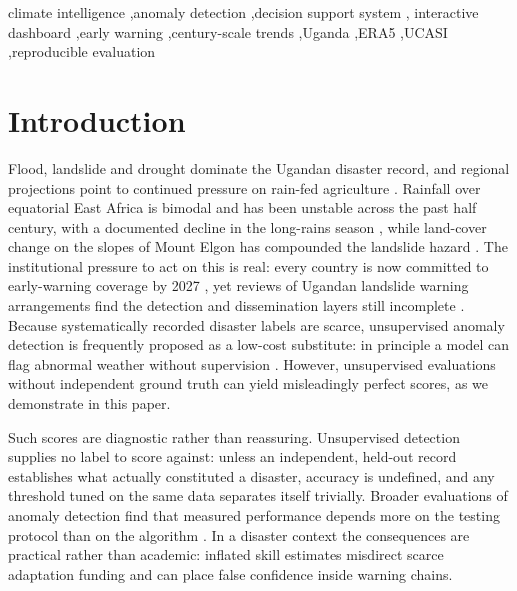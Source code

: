 \documentclass[preprint,12pt]{elsarticle}
\begin{document}
\begin{frontmatter}
\begin{keyword}
climate intelligence \sep anomaly detection \sep decision support system \sep
interactive dashboard \sep early warning \sep century-scale trends \sep Uganda
\sep ERA5 \sep UCASI \sep reproducible evaluation
\end{keyword}

\end{frontmatter}

\linenumbers

\section{Introduction}
Flood, landslide and drought dominate the Ugandan disaster record, and regional
projections point to continued pressure on rain-fed agriculture
\cite{ipcc2022,unma2022}. Rainfall over equatorial East Africa is bimodal and has
been unstable across the past half century, with a documented decline in the
long-rains season \cite{palmer2023,lyon2012,cattani2018}, while land-cover change
on the slopes of Mount
Elgon has compounded the landslide hazard \cite{mugagga2012}. The institutional
pressure to act on this is real: every country is now committed to early-warning
coverage by 2027 \cite{wmo2023}, yet reviews of Ugandan landslide warning
arrangements find the detection and dissemination layers still incomplete
\cite{namwano2024,venning2025}. Because systematically recorded disaster labels
are scarce, unsupervised anomaly detection is frequently proposed as a low-cost
substitute: in principle a model can flag abnormal weather without supervision
\cite{blazquez2021,pang2021}. However, unsupervised evaluations without independent ground truth can yield misleadingly perfect scores, as we demonstrate in this paper.

Such scores are diagnostic rather than reassuring. Unsupervised
detection supplies no label to score against: unless an independent, held-out
record establishes what actually constituted a disaster, accuracy is undefined,
and any threshold tuned on the same data separates itself trivially. Broader
evaluations of anomaly detection find that measured performance depends more on
the testing protocol than on the algorithm \cite{schmidl2022}. In a disaster
context the consequences are practical rather than academic: inflated skill
estimates misdirect scarce adaptation funding and can place false confidence
inside warning chains.
\end{document}
